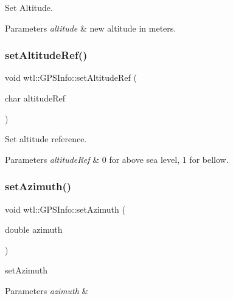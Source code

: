 Set Altitude. 


\begin{DoxyParams}{Parameters}
{\em altitude} & new altitude in meters. \\
\hline
\end{DoxyParams}
\mbox{\label{classwtl_1_1_g_p_s_info_a00e0e590f8284ab13125f093e7ad37bd}} 
\subsubsection{\texorpdfstring{set\+Altitude\+Ref()}{setAltitudeRef()}}
{\footnotesize\ttfamily void wtl\+::\+G\+P\+S\+Info\+::set\+Altitude\+Ref (\begin{DoxyParamCaption}\item[{char}]{altitude\+Ref }\end{DoxyParamCaption})}



Set altitude reference. 


\begin{DoxyParams}{Parameters}
{\em altitude\+Ref} & 0 for above sea level, 1 for bellow. \\
\hline
\end{DoxyParams}
\mbox{\label{classwtl_1_1_g_p_s_info_a20f8cec0456c226892b947d348a92ebb}} 
\subsubsection{\texorpdfstring{set\+Azimuth()}{setAzimuth()}}
{\footnotesize\ttfamily void wtl\+::\+G\+P\+S\+Info\+::set\+Azimuth (\begin{DoxyParamCaption}\item[{double}]{azimuth }\end{DoxyParamCaption})}



set\+Azimuth 


\begin{DoxyParams}{Parameters}
{\em azimuth} & \\
\hline
\end{DoxyParams}
\mbox{\label{classwtl_1_1_g_p_s_info_a91868a182c714d736e6ab1b480d64d00}} 
